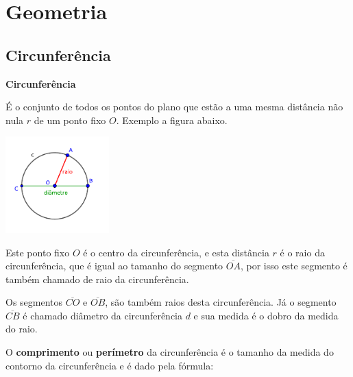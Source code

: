 
\chapter{Geometria}
\section{Circunferência}

\vskip0.3cm

\colorbox{azul}{
 \begin{minipage}{0.9\linewidth}
 \begin{center}
 \textbf{Circunferência}

  É o conjunto de todos os pontos do plano que estão a uma mesma distância não nula $r$ de um ponto fixo $O$. Exemplo a figura abaixo.
 \end{center}
 \end{minipage}}

 \vskip0.3cm

 \begin{center}
 \includegraphics[width=4cm]{./cap_geometria/figs/circunferencia}
 \end{center}

Este ponto fixo $O$ é o centro da circunferência, e esta distância $r$ é o raio da circunferência, que é igual ao tamanho do segmento $\overline{OA}$, por isso este segmento é também chamado de raio da circunferência.

Os segmentos $\overline{CO}$ e $\overline{OB}$, são também raios desta circunferência. Já o segmento $\overline{CB}$ é chamado diâmetro da circunferência $d$ e sua medida é o dobro da medida do raio.


O \textbf{comprimento} ou \textbf{perímetro} da circunferência é o tamanho da medida do contorno da circunferência e é dado pela fórmula:

